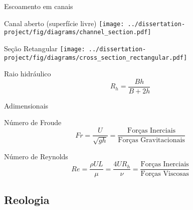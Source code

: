 \begin{frame}{Escoamento em canais}
    \begin{minipage}[c]{0.56\textwidth}
        \begin{exampleblock}{Canal aberto (superfície livre)}
            \centering
            \texttt{[image: ../dissertation-project/fig/diagrams/channel\_section.pdf]}
        \end{exampleblock}
    \end{minipage}
    \hfill
    \pause
    \begin{minipage}[c]{0.36\textwidth}
        \begin{exampleblock}{Seção Retangular}
            \centering
            \texttt{[image: ../dissertation-project/fig/diagrams/cross\_section\_rectangular.pdf]}
        \end{exampleblock}
        \begin{exampleblock}{Raio hidráulico}
            \begin{equation}
                R_h = \frac{Bh}{B+2h}
            \end{equation}
        \end{exampleblock}
    \end{minipage}
\end{frame}

\begin{frame}{Adimensionais}
    \begin{exampleblock}{Número de Froude}
        \begin{equation}
            Fr = \frac{U}{\sqrt{gh}} 
            = \frac{\text{Forças Inerciais}}{\text{Forças Gravitacionais}}
        \end{equation}        
    \end{exampleblock}

    \begin{exampleblock}{Número de Reynolds}
        \begin{equation}
            Re = \frac{\rho U L}{\mu} = \frac{4UR_h}{\nu} 
            = \frac{\text{Forças Inerciais}}{\text{Forças Viscosas}}
        \end{equation}        
    \end{exampleblock}
\end{frame}



\subsection{Reologia}

